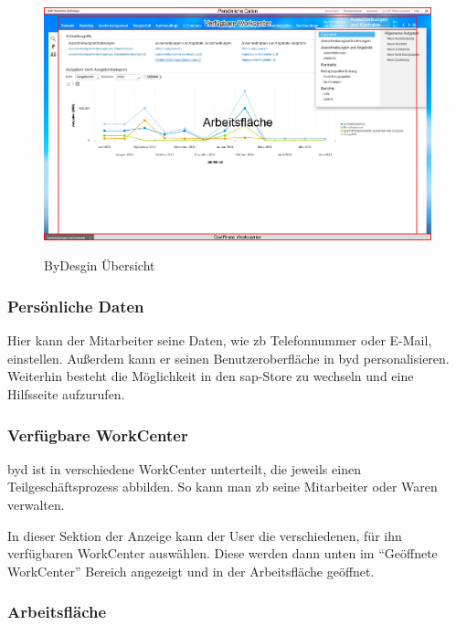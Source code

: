 \begin{figure}[H]
	\begin{center}
	\includegraphics[width=1.0\textwidth]{grafiken/ByDesign-Ubersicht.png}
	\caption{ByDesgin Übersicht}
	\vspace{-10pt}
	\label{abb:byd-overview}
	\end{center}
\end{figure}

\subsubsection{Persönliche Daten}

Hier kann der Mitarbeiter seine Daten, wie \gls{zb} Telefonnummer oder E-Mail, einstellen. Außerdem kann er seinen Benutzeroberfläche in \gls{byd} personalisieren. Weiterhin besteht die Möglichkeit in den \gls{sap}-Store zu wechseln und eine Hilfsseite aufzurufen.

\subsubsection{Verfügbare WorkCenter}

\gls{byd} ist in verschiedene WorkCenter unterteilt, die jeweils einen Teilgeschäftsprozess abbilden. So kann man \gls{zb} seine Mitarbeiter oder Waren verwalten.

In dieser Sektion der Anzeige kann der User die verschiedenen, für ihn verfügbaren WorkCenter auswählen. Diese werden dann unten im "`Geöffnete WorkCenter"' Bereich angezeigt und in der Arbeitsfläche geöffnet.

\subsubsection{Arbeitsfläche}

